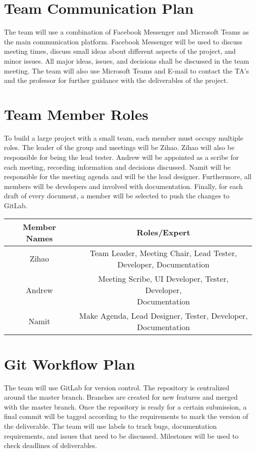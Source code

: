 \documentclass{article}
\begin{document}
\section{Team Communication Plan}
The team will use a combination of Facebook Messenger and Microsoft Teams as the main communication platform. Facebook Messenger will be used to discuss meeting times, discuss small ideas about different aspects of the project, and minor issues. All major ideas, issues, and decisions shall be discussed in the team meeting. The team will also use Microsoft Teams and E-mail to contact the TA's and the professor for further guidance with the deliverables of the project.  

\section{Team Member Roles}
To build a large project with a small team, each member must occupy multiple roles. The leader of the group and meetings will be Zihao.
Zihao will also be responsible for being the lead tester. Andrew will be appointed as a scribe for each meeting, recording information and decisions discussed. Namit will be responsible for the meeting agenda and will be the lead designer. Furthermore, all members will be developers and involved with documentation. Finally, for each draft of every document, a member will be selected to push the changes to GitLab.


\begin{table}[h]
    \centering
    \begin{tabular}{|c|c|}
    \hline
         Member Names & Roles/Expert  \\
         \hline
         Zihao & \shortstack{ Team Leader, Meeting Chair,  Lead Tester, \\ Developer, Documentation }\\
         \hline
         Andrew & \shortstack{ Meeting Scribe, UI Developer, Tester, Developer, \\ Documentation}\\
         \hline
         Namit & \shortstack{Make Agenda, Lead Designer, Tester, Developer, \\ Documentation} \\
         \hline
    \end{tabular}
    \label{tab:my_label}
\end{table}

\section{Git Workflow Plan}
The team will use GitLab for version control. The repository is centralized around the master branch. Branches are created for new features and merged with the master branch. Once the repository is ready for a certain submission, a final commit will be tagged according to the requirements to mark the version of the deliverable. The team will use labels to track bugs, documentation requirements, and issues that need to be discussed. Milestones will be used to check deadlines of deliverables.
\end{document}
